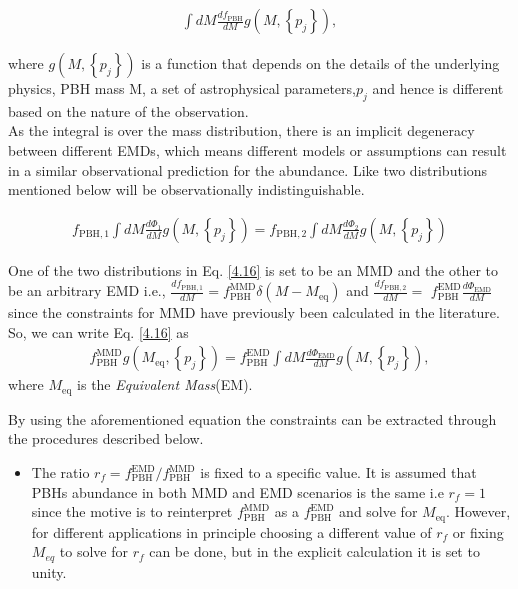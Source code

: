 \begin{align}
    \int d M \frac{d f_{\mathrm{PBH}}}{d M} g\left(M,\left\{p_{j}\right\}\right),\label{4.15}
\end{align}

where $g\left(M,\left\{p_{j}\right\}\right)$ is a function that depends on the details of the underlying physics, PBH mass M, a set of astrophysical parameters,$p_{j}$ and hence is different based on the nature of the observation.\\
As the integral is over the mass distribution, there is an implicit degeneracy between different EMDs, which means different models or assumptions can result in a similar observational prediction for the abundance. Like two distributions mentioned below will be observationally indistinguishable.

\begin{align}
    f_{\mathrm{PBH}, 1} \int d M \frac{d \Phi_{1}}{d M} g\left(M,\left\{p_{j}\right\}\right)=f_{\mathrm{PBH}, 2} \int d M \frac{d \Phi_{2}}{d M} g\left(M,\left\{p_{j}\right\}\right) \label{4.16}
\end{align}

One of the two distributions in Eq. \ref{4.16} is set to be an MMD and the other to be an arbitrary EMD i.e., $\frac{d f_{\mathrm{PBH}, 1}}{d M}=f_{\mathrm{PBH}}^{\mathrm{MMD}} \delta\left(M-M_{\mathrm{eq}}\right)$ and $\frac{d f_{\mathrm{PBH}, 2}}{d M}=$ $f_{\mathrm{PBH}}^{\mathrm{EMD}} \frac{d \Phi_{\mathrm{EMD}}}{d M}$ since the constraints for MMD have previously been calculated in the literature. So, we can write Eq. \ref{4.16} as
\begin{align}
    f_{\mathrm{PBH}}^{\mathrm{MMD}} g\left(M_{\mathrm{eq}},\left\{p_{j}\right\}\right)=f_{\mathrm{PBH}}^{\mathrm{EMD}} \int d M \frac{d \Phi_{\mathrm{EMD}}}{d M} g\left(M,\left\{p_{j}\right\}\right), \label{4.17}
\end{align}
 where $M_{\mathrm{eq}}$ is the \emph{Equivalent Mass}(EM).
 
By using the aforementioned equation the constraints can be extracted through the procedures described below.

\begin{itemize}
    \item The ratio $r_{f}=f_{\mathrm{PBH}}^{\mathrm{EMD}} / f_{\mathrm{PBH}}^{\mathrm{MMD}}$ is fixed to a specific value. It is assumed that PBHs abundance in both MMD and EMD scenarios is the same i.e $r_{f}= 1$ since the motive is to reinterpret $f_{\mathrm{PBH}}^{\mathrm{MMD}}$ as a $f_{\mathrm{PBH}}^{\mathrm{EMD}}$ and solve for $M_{\mathrm{eq}}$. However, for different applications in principle choosing a different value of $r_{f}$ or fixing $M_{eq}$ to solve for $r_{f}$ can be done, but in the explicit calculation it is set to unity.
\end{itemize}


